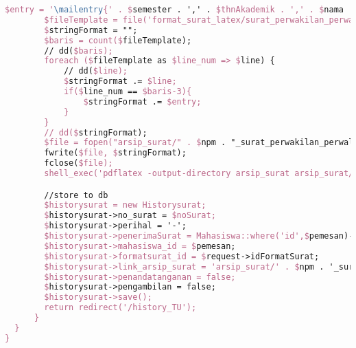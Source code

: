 \begin{lstlisting}[language=tex,basicstyle=\tiny,caption=HistorysuratController.php]
        $entry = '\mailentry{' . $semester . ',' . $thnAkademik . ',' . $nama . ',' . $prodi . ',' . $npm . ',' . $namaWakil . ',' . $prodiWakil . ',' . $npmWakil . ',' . $dosenWali . ',' . $alasan . ',' . $kodeMK1 . ',' . $matkul1 . ',' . $sks1 . ',' . $kodeMK2 . ',' . $matkul2 . ',' . $sks2 . ',' . $kodeMK3 . ',' . $matkul3 . ',' . $sks3 . ',' . $kodeMK4 . ',' . $matkul4 . ',' . $sks4 . ',' . $kodeMK5 . ',' . $matkul5 . ',' . $sks5 . ',' . $kodeMK6 . ',' . $matkul6 . ',' . $sks6 . ',' .$kodeMK7 . ',' . $matkul7 . ',' . $sks7 . ',' . $kodeMK8 . ',' . $matkul8 . ',' . $sks8 . ',' . $kodeMK9 . ',' . $matkul9 . ',' . $sks9 . ',' . $kodeMK10 . ',' . $matkul10 . ',' . $sks10 . ',' . $tanggal . '}';
        $fileTemplate = file('format_surat_latex/surat_perwakilan_perwalian_10mk.tex');
        $stringFormat = "";
        $baris = count($fileTemplate);
        // dd($baris);
        foreach ($fileTemplate as $line_num => $line) {
            // dd($line);
            $stringFormat .= $line;
            if($line_num == $baris-3){
                $stringFormat .= $entry;
            }
        }
        // dd($stringFormat);
        $file = fopen("arsip_surat/" . $npm . "_surat_perwakilan_perwalian_10mk.tex", "w");
        fwrite($file, $stringFormat);
        fclose($file);
        shell_exec('pdflatex -output-directory arsip_surat arsip_surat/' . $npm . '_surat_perwakilan_perwalian_10mk.tex');

        //store to db
        $historysurat = new Historysurat;
        $historysurat->no_surat = $noSurat;
        $historysurat->perihal = '-';
        $historysurat->penerimaSurat = Mahasiswa::where('id',$pemesan)->first()->dosen->nama_dosen;
        $historysurat->mahasiswa_id = $pemesan;
        $historysurat->formatsurat_id = $request->idFormatSurat;
        $historysurat->link_arsip_surat = 'arsip_surat/' . $npm . '_surat_perwakilan_perwalian_10mk.pdf';
        $historysurat->penandatanganan = false;
        $historysurat->pengambilan = false;
        $historysurat->save();
        return redirect('/history_TU');
      }
  }
}
\end{lstlisting}

